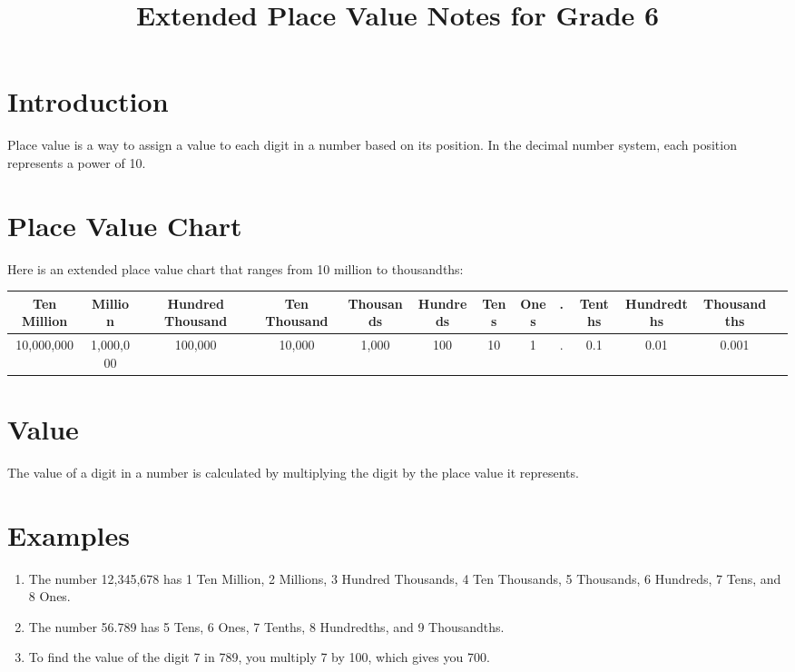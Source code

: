 \documentclass{article}
\begin{document}
\title{Extended Place Value Notes for Grade 6}
\maketitle

\section{Introduction}
Place value is a way to assign a value to each digit in a number based on its position. In the decimal number system, each position represents a power of 10.

\section{Place Value Chart}
Here is an extended place value chart that ranges from 10 million to thousandths:

\begin{flushleft}

\begin{center}
\begin{tabular}{|c|c|c|c|c|c|c|c|c|c|c|c|c|}
\hline
Ten Million & Million & Hundred Thousand & Ten Thousand & Thousands & Hundreds & Tens & Ones & . & Tenths & Hundredths & Thousandths \\
\hline
10,000,000 & 1,000,000 & 100,000 & 10,000 & 1,000 & 100 & 10 & 1 & . & 0.1 & 0.01 & 0.001 \\
\hline
\end{tabular}
\end{center}

\end{flushleft}

\section{Value}
The value of a digit in a number is calculated by multiplying the digit by the place value it represents.

\section{Examples}
\begin{enumerate}
\item The number 12,345,678 has 1 Ten Million, 2 Millions, 3 Hundred Thousands, 4 Ten Thousands, 5 Thousands, 6 Hundreds, 7 Tens, and 8 Ones.
\item The number 56.789 has 5 Tens, 6 Ones, 7 Tenths, 8 Hundredths, and 9 Thousandths.
\item To find the value of the digit 7 in 789, you multiply 7 by 100, which gives you 700.
\end{enumerate}
\end{document}
